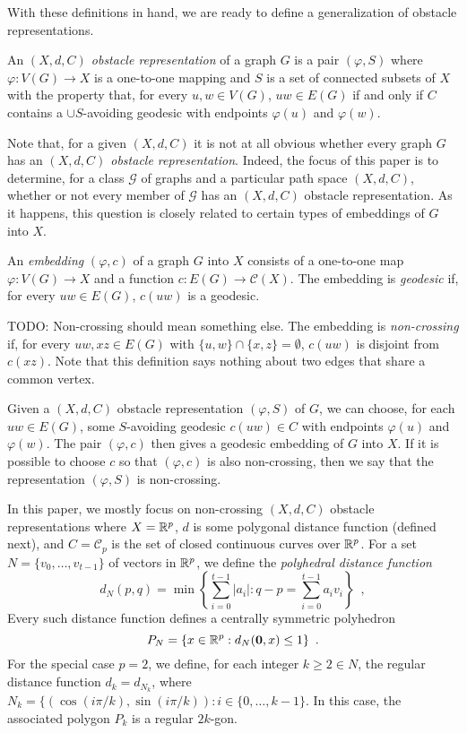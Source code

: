 \documentclass{patmorin}
\begin{document}
With these definitions in hand, we are ready to define a generalization
of obstacle representations.

\begin{defn}
An \emph{$(X,d,C)$ obstacle representation} of a graph $G$ is a pair
$(\varphi, S)$ where $\varphi:V(G)\to X$ is a one-to-one mapping and
$S$ is a set of connected subsets of $X$ with the property that, for
every $u,w\in V(G)$, $uw\in E(G)$ if and only if $C$ contains a $\cup
S$-avoiding geodesic with endpoints $\varphi(u)$ and $\varphi(w)$.
\end{defn}

Note that, for a given $(X,d,C)$ it is not at all obvious whether every
graph $G$ has an \emph{$(X,d,C)$ obstacle representation}.  Indeed,
the focus of this paper is to determine, for a class $\mathcal{G}$ of
graphs and a particular path space $(X,d,C)$, whether or not every
member of $\mathcal{G}$ has an $(X,d,C)$ obstacle representation.
As it happens, this question is closely related to certain types of
embeddings of $G$ into $X$.

An \emph{embedding} $(\varphi,c)$ of a graph $G$ into $X$ consists
of a one-to-one map $\varphi:V(G)\to X$ and a function $c: E(G)\to
\mathcal{C}(X)$.  The embedding is \emph{geodesic} if, for every $uw\in
E(G)$, $c(uw)$ is a geodesic.  

TODO: Non-crossing should mean something else.
The embedding is \emph{non-crossing} if,
for every $uw,xz\in E(G)$ with $\{u,w\}\cap \{x,z\}=\emptyset$, $c(uw)$
is disjoint from $c(xz)$.  Note that this definition says nothing about
two edges that share a common vertex.

Given a $(X,d,C)$ obstacle representation $(\varphi,S)$ of $G$, we can
choose, for each $uw\in E(G)$, some $S$-avoiding geodesic $c(uw)\in C$
with endpoints $\varphi(u)$ and $\varphi(w)$.  The pair $(\varphi,c)$
then gives a geodesic embedding of $G$ into $X$.  If it is possible to
choose $c$ so that $(\varphi,c)$ is also non-crossing, then we say that
the representation $(\varphi,S)$ is non-crossing.




In this paper, we mostly focus on non-crossing $(X,d,C)$ obstacle
representations where $X=\mathbb{R}^p$, $d$ is some polygonal distance function
(defined next), and $C=\mathcal{C}_p$ is the set of closed continuous
curves over $\mathbb{R}^p$.  For a set $N=\{v_0,\ldots,v_{t-1}\}$ of vectors in
$\mathbb{R}^p$, we define the \emph{polyhedral distance function}
\[  
   d_N(p,q)=\min\left\{\sum_{i=0}^{t-1}|a_i|: 
                        q-p=\sum_{i=0}^{t-1}a_iv_i\right\} \enspace ,
\]
Every such distance function defines a centrally symmetric polyhedron
\[
   P_N=\{x\in\mathbb{R}^p: d_N(\mathbf{0},x)\le 1\}  \enspace .
\]
For the special case $p=2$, we define, for each integer $k\ge 2 \in N$,
the regular distance function $d_k=d_{N_k}$, where $N_k=\{(\cos(i\pi/k),
\sin(i\pi/k)): i\in\{0,\ldots,k-1\}$.  In this case, the associated
polygon $P_k$ is a regular $2k$-gon.
\end{document}
